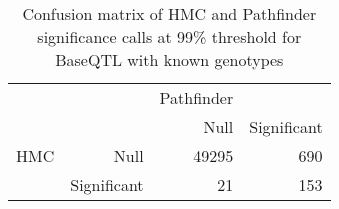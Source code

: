 \begin{table}[ht]
\centering
\caption{Confusion matrix of HMC and Pathfinder significance calls at 99\% threshold for BaseQTL with known genotypes} 
\label{tab:GT-xtab-99-pf}
\begin{tabular}{rr|rr}
   &  & Pathfinder &  \\ 
    &   & Null & Significant \\ 
   \hline
HMC & Null & 49295 & 690 \\ 
    & Significant & 21 & 153 \\ 
  \end{tabular}
\end{table}
